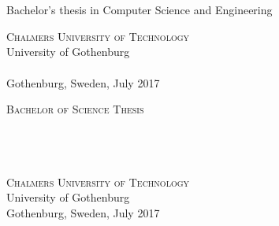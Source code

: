
\begin{titlepage}
			
\addtolength{\voffset}{2cm}


\mbox{}
\vfill
\renewcommand{\familydefault}{\sfdefault} \normalfont %
\textbf{{\Huge{}\varHeadline}} 	\\[0.5cm]
{\Large \varSubtitle}\\[0.5cm] Bachelor's thesis in Computer Science and Engineering \setlength{\parskip}{1cm}

{\Large \varNames} \setlength{\parskip}{2.9cm}

\vspace*{0.5cm}
\textsc{Chalmers University of Technology} \\
University of Gothenburg \\
\varDepartment \\
Gothenburg, Sweden, July 2017

\renewcommand{\familydefault}{\rmdefault} \normalfont %
\end{titlepage}

\newpage
\thispagestyle{empty}
\begin{center}
	\textsc{\large Bachelor of Science Thesis}\\[4cm]		%
	\textbf{\Large \varHeadline} \\[1cm]
	{\large \varSubtitle}\\[1cm]
	{\large \varNames}
	
	\vfill	
	
	\varDepartment \\
	\textsc{Chalmers University of Technology} \\
	University of Gothenburg \\
	Gothenburg, Sweden, July 2017 \\
\end{center}


